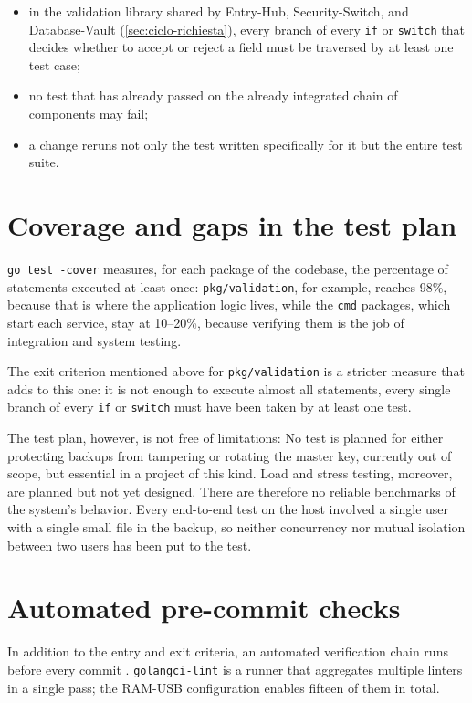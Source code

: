 \begin{itemize}
    \item in the validation library shared by Entry-Hub, Security-Switch, and Database-Vault
    (\autoref{sec:ciclo-richiesta}), every branch of every \texttt{if} or \texttt{switch} that decides whether to
    accept or reject a field must be traversed by at least one test case;
    \item no test that has already passed on the already integrated chain of components may fail;
    \item a change reruns not only the test written specifically for it but the entire test suite.
\end{itemize}

\section{Coverage and gaps in the test plan}

\texttt{go test -cover} measures, for each package of the codebase, the percentage of statements executed
at least once: \texttt{pkg/validation}, for example, reaches 98\%, because that is where the application logic lives,
while the \texttt{cmd} packages, which start each service, stay at 10--20\%, because verifying them is
the job of integration and system testing.

The exit criterion mentioned above for \texttt{pkg/validation} is a stricter measure that adds to
this one: it is not enough to execute almost all statements, every single branch of every \texttt{if} or
\texttt{switch} must have been taken by at least one test.

The test plan, however, is not free of limitations:
No test is planned for either protecting backups from tampering or rotating the
master key, currently out of scope, but essential in a project of this kind.
Load and stress testing, moreover, are planned but not yet designed. There are therefore no
reliable benchmarks of the system's behavior.
Every end-to-end test on the host involved a single user with a single small file in the backup, so neither
concurrency nor mutual isolation between two users has been put to the test.

\section{Automated pre-commit checks}

In addition to the entry and exit criteria, an automated verification chain runs before every
commit \cite{ramusb-contributing}. \texttt{golangci-lint} \cite{golangci-lint} is a runner that aggregates
multiple linters in a single pass; the RAM-USB configuration enables fifteen of them in total.

